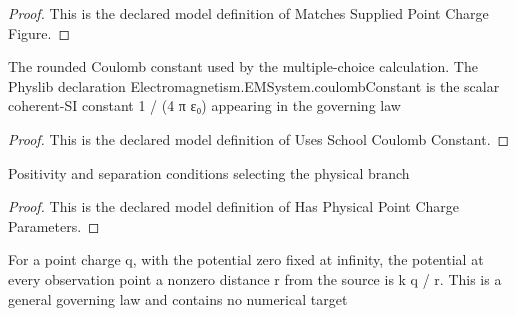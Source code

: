 \begin{proof}
  This is the declared model definition of Matches Supplied Point Charge Figure.
\end{proof}
\begin{definition}
  \label{def:physics:phyx-mini-0857:phyxminiproblems-problemphyxmini0857-usesschoolcoulombconstant}
  The rounded Coulomb constant used by the multiple-choice calculation. The Physlib declaration Electromagnetism.EMSystem.coulombConstant is the scalar coherent-SI constant 1 / (4 π ε₀) appearing in the governing law
\end{definition}
\begin{proof}
  This is the declared model definition of Uses School Coulomb Constant.
\end{proof}
\begin{definition}
  \label{def:physics:phyx-mini-0857:phyxminiproblems-problemphyxmini0857-hasphysicalpointchargeparameters}
  Positivity and separation conditions selecting the physical branch
\end{definition}
\begin{proof}
  This is the declared model definition of Has Physical Point Charge Parameters.
\end{proof}
\begin{definition}
  \label{def:physics:phyx-mini-0857:phyxminiproblems-problemphyxmini0857-satisfiespointchargepotentiallaw}
  For a point charge q, with the potential zero fixed at infinity, the potential at every observation point a nonzero distance r from the source is k q / r. This is a general governing law and contains no numerical target
\end{definition}
